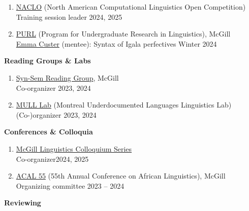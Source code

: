 \documentclass[margin,line]{resume}
\begin{document}
\begin{resume}
\begin{enumerate}[-, leftmargin=1em, topsep=2pt]
		\item[] \href{https://naclo.org/}{NACLO} (North American Computational Linguistics Open Competition)\\
		      \hphantom{...}Training session leader \hfill 2024, 2025

		\item[] \href{https://www.mcgill.ca/cogsci/research/cogs396}{PURL} (Program for Undergraduate Research in Linguistics), McGill\\
		      \hphantom{...}\href{https://www.linkedin.com/in/emma-custer-648345252}{Emma Custer} (mentee): Syntax of Igala perfectives \hfill Winter 2024
	\end{enumerate}

	\textbf{Reading Groups \& Labs}
	\begin{enumerate}[-, leftmargin=1em, topsep=2pt]
		\item[] \href{https://mcling.blogs.mcgill.ca/category/syntax-semantics-group/}{Syn-Sem Reading Group}, McGill\\
		\hphantom{...}Co-organizer \hfill 2023, 2024

		\item[] \href{https://mcling.blogs.mcgill.ca/category/mull-lab/}{MULL Lab} (Montreal Underdocumented Languages Linguistics Lab)\\
		      \hphantom{...}(Co-)organizer \hfill 2023, 2024
	\end{enumerate}

	\textbf{Conferences \& Colloquia}
	\begin{enumerate}[-, leftmargin=1em, topsep=2pt]
		\item[] \href{https://www.mcgill.ca/linguistics/events/colloquium-series}{McGill Linguistics Colloquium Series}\\
		      \hphantom{...}Co-organizer\hfill 2024, 2025

		\item[] \href{https://acal55.mull-lab.org/}{ACAL 55} (55th Annual Conference on African Linguistics), McGill\\
		      \hphantom{...}Organizing committee \hfill 2023 -- 2024
	\end{enumerate}

	\textbf{Reviewing}
	\begin{enumerate}[-, leftmargin=1em, topsep=2pt]


\end{enumerate}
\end{resume}
\end{document}
